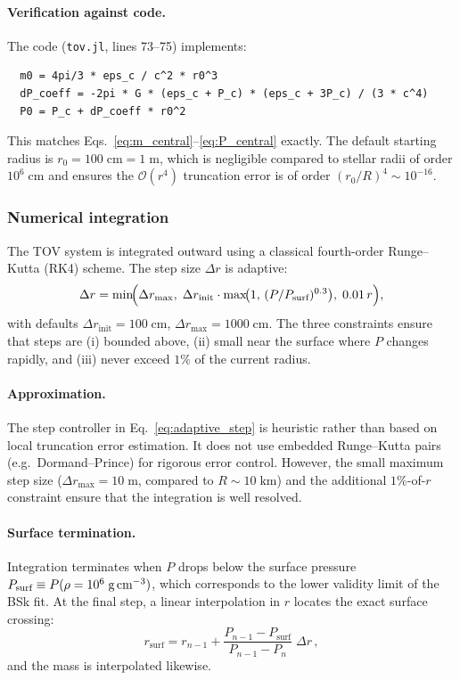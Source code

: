 \paragraph{Verification against code.}
The code (\texttt{tov.jl}, lines 73--75) implements:
\begin{verbatim}
  m0 = 4pi/3 * eps_c / c^2 * r0^3
  dP_coeff = -2pi * G * (eps_c + P_c) * (eps_c + 3P_c) / (3 * c^4)
  P0 = P_c + dP_coeff * r0^2
\end{verbatim}
This matches Eqs.~\eqref{eq:m_central}--\eqref{eq:P_central} exactly.
The default starting radius is $r_0 = 100\;\text{cm} = 1\;\text{m}$, which
is negligible compared to stellar radii of order $10^{6}\;\text{cm}$ and
ensures the $\mathcal{O}(r^{4})$ truncation error is of order
$(r_{0}/R)^{4}\sim10^{-16}$.

\subsubsection{Numerical integration}

The TOV system is integrated outward using a classical fourth-order
Runge--Kutta (RK4) scheme.  The step size $\Delta r$ is adaptive:
\begin{equation}
  \Delta r = \min\!\Bigl(
    \Delta r_{\max},\;
    \Delta r_{\text{init}}\cdot\max\!\bigl(1,\,(P/P_{\text{surf}})^{0.3}\bigr),\;
    0.01\,r
  \Bigr),
  \label{eq:adaptive_step}
\end{equation}
with defaults $\Delta r_{\text{init}}=100\;\text{cm}$,
$\Delta r_{\max}=1000\;\text{cm}$.
The three constraints ensure that steps are (i) bounded above, (ii) small
near the surface where $P$ changes rapidly, and (iii) never exceed $1\%$ of
the current radius.

\paragraph{Approximation.}
The step controller in Eq.~\eqref{eq:adaptive_step} is heuristic rather
than based on local truncation error estimation.  It does not use
embedded Runge--Kutta pairs (e.g.\ Dormand--Prince) for rigorous error
control.  However, the small maximum step size
($\Delta r_{\max}=10\;\text{m}$, compared to $R\sim10\;\text{km}$) and the
additional $1\%$-of-$r$ constraint ensure that the integration is well
resolved.

\paragraph{Surface termination.}
Integration terminates when $P$ drops below the surface pressure
$P_{\text{surf}} \equiv P(\rho=10^{6}\;\text{g\,cm}^{-3})$, which
corresponds to the lower validity limit of the BSk fit.  At the final step,
a linear interpolation in $r$ locates the exact surface crossing:
\begin{equation}
  r_{\text{surf}} = r_{n-1}
    + \frac{P_{n-1}-P_{\text{surf}}}{P_{n-1}-P_{n}}\;\Delta r\,,
  \label{eq:surface_interp}
\end{equation}
and the mass is interpolated likewise.

